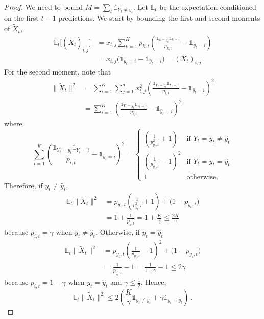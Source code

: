 \documentclass[11pt]{hackednow}
\newcommand{\E}{\mathbb{E}}
\def\ds1{\mathds{1}}
\newcommand{\wh}{\widehat}
\newcommand{\dt}{\displaystyle}
\newcommand{\yhat}{\wh{y}}
\newcommand{\tX}{\widetilde{X}}
\begin{document}
\begin{proof}
We need to bound $M = \sum_t \ds1_{Y_t \neq y_t}$. Let $\E_t$ be the expectation conditioned on the first $t-1$ predictions. We start by bounding the first and second moments of $\tX_t$,
\begin{align*}
    \E_t\bigl[(\tX_t)_{i,j}\bigr]
&=
    x_{t,j}\sum_{k=1}^K p_{k,t}\left(\frac{\ds1_{k = y_t}\ds1_{k = i}}{p_{k,t}} - \ds1_{\yhat_t = i}\right)
\\ &=
    x_{t,j}\bigl(\ds1_{y_t=i} - \ds1_{\yhat_t=i}\bigr) = (X_t)_{i,j}~.
\end{align*}
For the second moment, note that
\begin{align*}
    \bigl\|\tX_t\bigr\|^2
&=
    \sum_{i=1}^K\sum_{j=1}^d x_{t,j}^2\left(\frac{\ds1_{Y_t = y_t}\ds1_{Y_t = i}}{p_{i,t}} - \ds1_{\yhat_t = i}\right)^2
\\ &=
    \sum_{i=1}^K\left(\frac{\ds1_{Y_t = y_t}\ds1_{Y_t = i}}{p_{i,t}} - \ds1_{\yhat_t = i}\right)^2
\end{align*}
where
\[
    \sum_{i=1}^K\left(\frac{\ds1_{Y_t = y_t}\ds1_{Y_t = i}}{p_{i,t}} - \ds1_{\yhat_t = i}\right)^2
=
    \left\{ \begin{array}{cl}
    {\dt \left(\frac{1}{p_{y_t,t}^2} + 1\right) } & \text{if $Y_t = y_t \neq \yhat_t$}
\\[2mm]
    {\dt \left(\frac{1}{p_{y_t,t}} - 1\right)^2 } & \text{if $Y_t = y_t = \yhat_t$}
\\[2mm]
    1 & \text{otherwise.}
    \end{array} \right.
\]
Therefore, if $y_t \neq \yhat_t$,
\begin{align*}
    \E_t\bigl\|\tX_t\bigr\|^2
&=
    p_{y_t,t}\left(\frac{1}{p_{y_t,t}^2} + 1\right) + \bigl(1-p_{y_t,t}\bigr)
\\&=
    1 + \frac{1}{p_{y,t}}
=
    1 + \frac{K}{\gamma}
\le
    \frac{2K}{\gamma}
\end{align*}
because $p_{i,t} = \gamma$ when $y_t \neq \yhat_t$.
Otherwise, if $y_t = \yhat_t$
\begin{align*}
    \E_t\bigl\|\tX_t\bigr\|^2
&=
    p_{y_t,t}\left(\frac{1}{p_{y_t,t}} - 1\right)^2 + \bigl(1-p_{y_t,t}\bigr)
\\&=
    \frac{1}{p_{y_t,t}} - 1
=
    \frac{1}{1-\gamma} - 1
\le
    2\gamma
\end{align*}
because $p_{i,t} = 1-\gamma$ when $y_t = \yhat_t$ and $\gamma \le \tfrac{1}{2}$.
Hence,
\[
    \E_t\bigl\|\tX_t\bigr\|^2
\le
    2\left(\frac{K}{\gamma}\ds1_{y_t \neq \yhat_t} + \gamma\ds1_{y_t = \yhat_t}\right)~.
\]

\end{proof}
\end{document}
